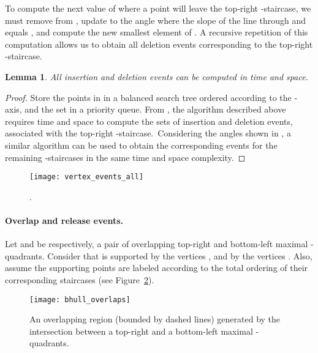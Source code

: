 \documentclass[11pt,letterpaper,english]{article}
\newtheorem{lemma}{Lemma}
\theoremstyle{definition}
\begin{document}
To compute the next value of  where a point will leave the
top-right -staircase, we must remove  from
, update  to the angle where the slope of the
line through  and  equals ,
and compute the new smallest element of . A recursive
repetition of this computation allows us to obtain all deletion events
corresponding to the top-right -staircase.

\begin{lemma}\label{bhull:lemma:point_events}
  All insertion and deletion events can be computed in 
  time and  space.
\end{lemma}
\begin{proof}
  Store the points in  in a balanced search tree ordered according
  to the -axis, and the set  in a priority queue. From
  , the algorithm described above
  requires  time and  space to compute the sets of
  insertion and deletion events, associated with the top-right
  -staircase.~Considering the angles shown in
  , a similar algorithm can be used to
  obtain the corresponding events for the remaining -staircases
  in the same time and space complexity.
\end{proof}

\begin{figure}[ht]
  \centering
  \begin{minipage}{0.9\textwidth}
    \centering
    \texttt{[image: vertex\_events\_all]}
\caption{.}
    \label{bhull:fig:point_events}
  \end{minipage}
\end{figure}

\paragraph{Overlap and release events.}

Let  and  be respectively, a pair of overlapping
top-right and bottom-left maximal -quadrants. Consider that
 is supported by the vertices , and  by the
vertices . Also, assume the supporting points are labeled
according to the total ordering of their corresponding staircases
(see Figure~\ref{bhull:fig:eventsw}).

\begin{figure}[ht]
  \centering
  \begin{minipage}{0.9\textwidth}
    \centering
\texttt{[image: bhull\_overlaps]}
    \caption{An overlapping region (bounded by dashed lines) generated
      by the intersection between a top-right and a bottom-left
      maximal -quadrants.}
    \label{bhull:fig:eventsw}
  \end{minipage}
\end{figure}
\end{document}
